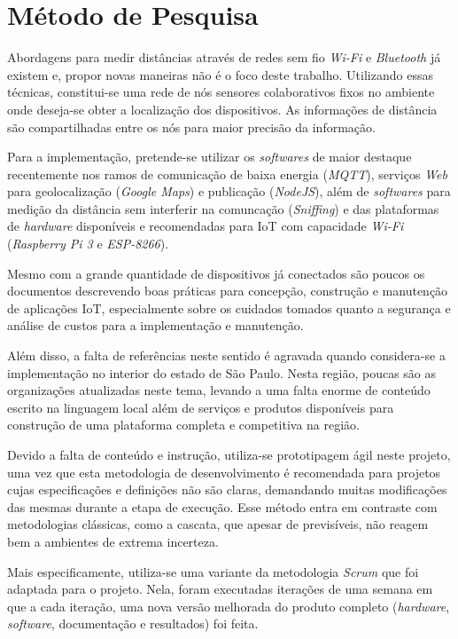 
\chapter{Método de Pesquisa}
\label{chap:Método de Pesquisa}

Abordagens para medir distâncias através de redes sem fio \emph{Wi-Fi}
\cite{bahillo2009ieee} e \emph{Bluetooth} já existem e, propor novas maneiras
não é o foco deste trabalho. Utilizando essas técnicas, constitui-se uma
rede de nós sensores colaborativos fixos no ambiente onde deseja-se obter a
localização dos dispositivos. As informações de distância são compartilhadas
entre os nós para maior precisão da informação.

Para a implementação, pretende-se utilizar os \emph{softwares} de maior
destaque recentemente nos ramos de comunicação de baixa energia (\emph{MQTT}),
serviços \emph{Web} para geolocalização (\emph{Google Maps}) e publicação
(\emph{NodeJS}), além de \emph{softwares} para medição da distância sem
interferir na comuncação (\emph{Sniffing}) e das plataformas de
\emph{hardware} disponíveis e recomendadas para IoT com capacidade
\emph{Wi-Fi} (\emph{Raspberry Pi 3} e \emph{ESP-8266}).

Mesmo com a grande quantidade de dispositivos já conectados são poucos os
documentos descrevendo boas práticas para concepção, construção e manutenção de
aplicações IoT, especialmente sobre os cuidados tomados quanto a segurança e
análise de custos para a implementação e manutenção.

Além disso, a falta de referências neste sentido é agravada quando considera-se
a implementação no interior do estado de São Paulo. Nesta região, poucas são as
organizações atualizadas neste tema, levando a uma falta enorme de conteúdo
escrito na linguagem local além de serviços e produtos disponíveis para
construção de uma plataforma completa e competitiva na região.

Devido a falta de conteúdo e instrução, utiliza-se prototipagem ágil neste
projeto, uma vez que esta metodologia de desenvolvimento é recomendada para
projetos cujas especificações e definições não são claras, demandando muitas
modificações das mesmas durante a etapa de execução. Esse método entra em
contraste com metodologias clássicas, como a cascata, que apesar de previsíveis,
não reagem bem a ambientes de extrema incerteza.

Mais especificamente, utiliza-se uma variante da metodologia \emph{Scrum}
\cite{James2016} que foi adaptada para o projeto. Nela, foram executadas
iterações de uma semana em que a cada iteração, uma nova versão melhorada do
produto completo (\emph{hardware}, \emph{software}, documentação e
resultados) foi feita.

